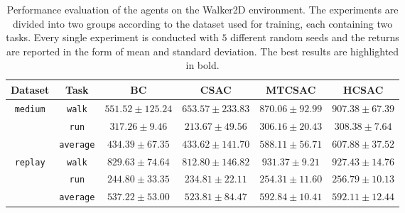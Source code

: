 \begin{table}[ht]
    \caption{Performance evaluation of the agents on the Walker2D environment. The experiments are divided into two groups according to the dataset used for training, each containing two tasks. Every single experiment is conducted with $5$ different random seeds and the returns are reported in the form of mean and standard deviation. The best results are highlighted in bold.}
    \label{tab:performance_evaluation}
    \centering
    {\small \begin{tabular}{cccccc}
        \toprule
        \textbf{Dataset} & \textbf{Task} & \textbf{BC} & \textbf{CSAC} & \textbf{MTCSAC} & \textbf{HCSAC} \\
        \midrule
        \multirow{3}{*}{\texttt{medium}} & \texttt{walk} & $551.52 \pm 125.24$ & $653.57 \pm 233.83$ & $870.06 \pm 92.99$ & $\bm{907.38 \pm 67.39}$ \\
        & \texttt{run} & $\bm{317.26 \pm 9.46}$ & $213.67 \pm 49.56$ & $306.16 \pm 20.43$ & $308.38 \pm 7.64$ \\
        & \texttt{average} & $434.39 \pm 67.35$ & $433.62 \pm 141.70$ & $588.11 \pm 56.71$ & $\bm{607.88 \pm 37.52}$ \\
        \midrule
        \multirow{3}{*}{\texttt{replay}} & \texttt{walk} & $829.63 \pm 74.64$ & $812.80 \pm 146.82$ & $\bm{931.37 \pm 9.21}$ & $927.43 \pm 14.76$ \\
        & \texttt{run} & $244.80 \pm 33.35$ & $234.81 \pm 22.11$ & $254.31 \pm 11.60$ & $\bm{256.79 \pm 10.13}$ \\
        & \texttt{average} & $537.22 \pm 53.00$ & $523.81 \pm 84.47$ & $\bm{592.84 \pm 10.41}$ & $592.11 \pm 12.44$ \\
        \bottomrule
    \end{tabular}}
\end{table}